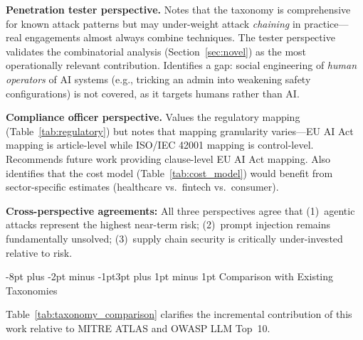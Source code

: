 \documentclass[conference]{IEEEtran}
\makeatletter
\renewcommand{\subsection}{\@startsection{subsection}{2}{\z@}%
  {-8pt plus -2pt minus -1pt}{3pt plus 1pt minus 1pt}%
  {\normalfont\normalsize\bfseries\sffamily\color{accentblue}}}
\makeatother
\begin{document}
\textbf{Penetration tester perspective.} Notes that the taxonomy is comprehensive for known attack patterns but may under-weight attack \emph{chaining} in practice---real engagements almost always combine techniques. The tester perspective validates the combinatorial analysis (Section~\ref{sec:novel}) as the most operationally relevant contribution. Identifies a gap: social engineering of \emph{human operators} of AI systems (e.g., tricking an admin into weakening safety configurations) is not covered, as it targets humans rather than AI.

\textbf{Compliance officer perspective.} Values the regulatory mapping (Table~\ref{tab:regulatory}) but notes that mapping granularity varies---EU AI Act mapping is article-level while ISO/IEC 42001 mapping is control-level. Recommends future work providing clause-level EU AI Act mapping. Also identifies that the cost model (Table~\ref{tab:cost_model}) would benefit from sector-specific estimates (healthcare vs.\ fintech vs.\ consumer).

\textbf{Cross-perspective agreements:} All three perspectives agree that (1)~agentic attacks represent the highest near-term risk; (2)~prompt injection remains fundamentally unsolved; (3)~supply chain security is critically under-invested relative to risk.

\subsection{Comparison with Existing Taxonomies}\label{sec:comparison}

Table~\ref{tab:taxonomy_comparison} clarifies the incremental contribution of this work relative to MITRE ATLAS and OWASP LLM Top~10.
\end{document}
